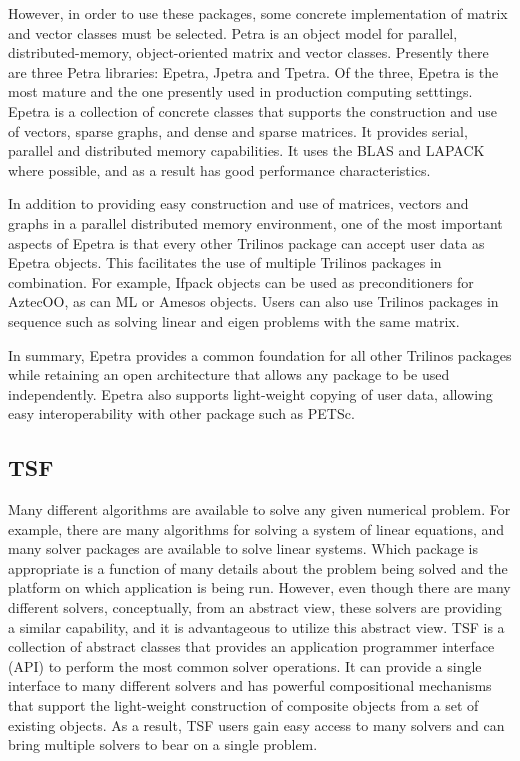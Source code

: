 \documentclass[12pt,relax]{TrilinosDevGuide}
\begin{document}
However, in order to use these packages, some concrete
implementation of matrix and vector classes must be selected.  
Petra is an object model for parallel,
distributed-memory, object-oriented matrix and vector classes.
Presently there are three Petra libraries: Epetra, Jpetra and Tpetra.
Of the three, Epetra is the most mature and the one presently used in
production computing setttings.  Epetra is a collection of concrete
classes that supports the construction and use of vectors, sparse
graphs, and dense and sparse matrices.  It provides serial, parallel and
distributed memory
capabilities.  It uses the BLAS and LAPACK where possible, and as a
result has good performance characteristics.

In addition to providing easy construction and use of matrices,
vectors and graphs in a parallel distributed memory environment,
one of the most important aspects of Epetra is that every other
Trilinos package can accept user data as Epetra objects.  This
facilitates the use of multiple Trilinos packages in combination.  For
example, Ifpack objects can be used as preconditioners for AztecOO, as
can ML or Amesos objects.  Users can also use Trilinos packages in
sequence such as solving linear and eigen problems with the same
matrix.

In summary, Epetra provides a common foundation for all other Trilinos
packages while retaining an open architecture that allows any package
to be used independently.  Epetra also supports light-weight copying of
user data, allowing easy interoperability with other package such as
PETSc.

\subsection{TSF}
\label{subsect:InteropTSF}
Many different algorithms are available to solve any given numerical
problem.  For example, there are many algorithms for solving a system
of linear equations, and many solver packages are available to solve
linear systems.  Which package is appropriate is a function of
many details about the problem being solved and the platform on which
application is being run. However, even though
there are many different solvers, conceptually, from an abstract view,
these solvers are providing a similar capability, and it is
advantageous to utilize this abstract view.
TSF is a collection of abstract classes that provides an application
programmer interface (API) to perform the most common solver
operations.  It can provide a single interface to many different
solvers and has powerful compositional mechanisms that support the
light-weight construction of composite objects from a set of
existing objects.  As a result, TSF users gain easy access to many
solvers and can bring multiple solvers to bear on a single problem.
\end{document}
